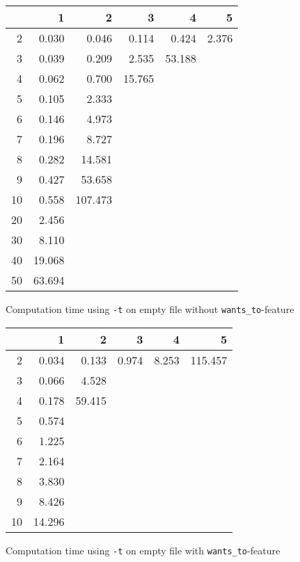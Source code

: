 \documentclass[a4paper,10pt]{article}
\begin{document}
	\begin{figure}[H]
		\begin{center}
			\begin{tabular}{r|r|r|r|r|r}
				\backslashbox{$F$}{$n$} & 1 & 2 & 3 & 4 & 5 \\ \hline
				2	& 0.030		& 0.046		& 0.114		& 0.424		& 2.376	\\ \hline
				3	& 0.039		& 0.209		& 2.535		& 53.188	&		\\ \hline
				4	& 0.062		& 0.700		& 15.765	&			&		\\ \hline
				5	& 0.105		& 2.333		&			&			&		\\ \hline
				6	& 0.146		& 4.973		&			&			&		\\ \hline 
				7	& 0.196		& 8.727		&			&			&		\\ \hline
				8	& 0.282		& 14.581	&			&			&		\\ \hline
				9	& 0.427		& 53.658	&			&			&		\\ \hline
				10	& 0.558		& 107.473	&			&			&		\\ \hline
				20	& 2.456		&			&			&			&		\\ \hline
				30	& 8.110		&			&			&			&		\\ \hline
				40	& 19.068	&			&			&			&		\\ \hline
				50	& 63.694	&			&			&			&		\\ \hline
			\end{tabular}
		\end{center}
		
		\caption{Computation time using \texttt{-t} on empty file without \texttt{wants\_to}-feature}
	\end{figure}
	
	\begin{figure}[H]
		\begin{center}
			\begin{tabular}{r|r|r|r|r|r}
				\backslashbox{$F$}{$n$} & 1 & 2 & 3 & 4 & 5 \\ \hline
				2	& 0.034		& 0.133		& 0.974		& 8.253		& 115.457	\\ \hline
				3	& 0.066		& 4.528		& 			& 			&			\\ \hline
				4	& 0.178		& 59.415	& 			&			&			\\ \hline
				5	& 0.574		&			&			&			&			\\ \hline
				6	& 1.225		&			&			&			&			\\ \hline 
				7	& 2.164		&			&			&			&			\\ \hline
				8	& 3.830		&			&			&			&			\\ \hline
				9	& 8.426		&			&			&			&			\\ \hline
				10	& 14.296	&			&			&			&			\\ \hline
			\end{tabular}
		\end{center}
		
		\caption{Computation time using \texttt{-t} on empty file with \texttt{wants\_to}-feature}
	\end{figure}
	
\end{document}
